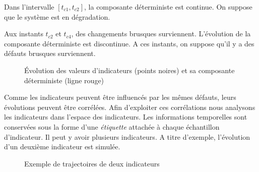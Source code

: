 \documentclass{article}
\begin{document}
Dans l'intervalle $\left[t_{c1},t_{c2}\right]$, la composante déterministe est continue.
On suppose que le système est en dégradation.

Aux instants $t_{c2}$ et $t_{c4}$, des changements brusques surviennent. 
L'évolution de la composante déterministe est discontinue. 
A ces instants, on suppose qu'il y a des défauts brusques surviennent.     


\begin{figure}[H]
	\centering
	\caption{Évolution des valeurs d'indicateurs (points noires) et sa composante déterministe (ligne rouge)}
	\label{fig:evolutionr1bis}
\end{figure}

Comme les indicateurs peuvent être influencés par les mêmes défauts, leurs évolutions peuvent être corrélées. 
Afin d'exploiter ces corrélations nous analysons les indicateurs dans l'espace des indicateurs.
Les informations temporelles sont conservées sous la forme d'une \textit{étiquette} attachée à chaque échantillon d'indicateur.
Il peut y avoir plusieurs indicateurs.
A titre d'exemple, l'évolution d'un deuxième indicateur est simulée. 


\begin{figure}[H]
	\centering
	\caption{Exemple de trajectoires de deux indicateurs}
	\label{fig:evolutionr2bis}
\end{figure}
\end{document}
